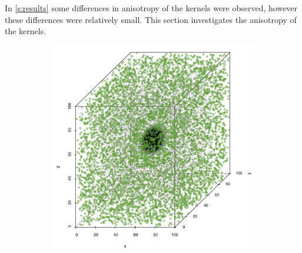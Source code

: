 
	In \cref{s:results} some differences in anisotropy of the kernels were observed, however these differences were relatively small. This section investigates the anisotropy of the kernels. 
	
			\begin{figure}
				\centering
				\begin{subfigure}{0.23\textwidth}
					\centering
					\includegraphics[keepaspectratio=true, width=\textwidth, height=0.23\textheight]{discussion/img/ferdosi_1_60000_anisotropy.png}
					\caption{}
					\label{fig:discussion:anisotropy:ferdosi1}
				\end{subfigure}
				\begin{subfigure}{0.23\textwidth}
					\centering

\end{subfigure}
\end{figure}
